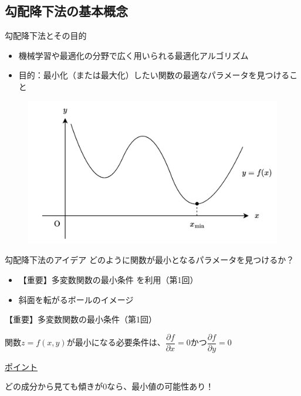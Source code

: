 \documentclass[dvipdfmx,aspectratio=169]{beamer}
\begin{document}
	\subsection{勾配降下法の基本概念}
	\begin{frame}{勾配降下法とその目的}
		\begin{itemize}
			\item 機械学習や最適化の分野で広く用いられる最適化アルゴリズム
			\item 目的：最小化（または最大化）したい関数の最適なパラメータを見つけること
		\end{itemize}
		\begin{figure}
			\centering
			\includegraphics[width=0.65\linewidth]{img/gradient-descent-method-the-point-at-which-the-function-is-minimized}
		\end{figure}
	\end{frame}
	\begin{frame}{勾配降下法のアイデア}
		どのように関数が最小となるパラメータを見つけるか？
		\begin{itemize}
			\item \alert{【重要】多変数関数の最小条件} を利用（第1回）
			\item 斜面を転がるボールのイメージ
		\end{itemize}
	\end{frame}
	\begin{frame}{【重要】多変数関数の最小条件（第1回）}
		\begin{screen}
			関数$ z = f(x, y) $が最小になる必要条件は、$ \dfrac{\partial f}{\partial x} = 0 $かつ$ \dfrac{\partial f}{\partial y} = 0 $
		\end{screen}
		\underline{ポイント}
		
		どの成分から見ても傾きが$ 0 $なら、最小値の可能性あり！
	\end{frame}
\end{document}

